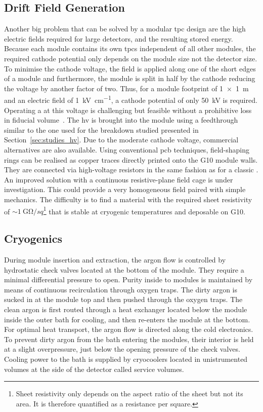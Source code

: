 \subsection{Drift Field Generation}
\label{sec:ac_argoncube_hv}

Another big problem that can be solved by a modular \gls{tpc} design are the high electric fields required for large detectors, and the resulting stored energy.
Because each module contains its own \glspl{tpc} independent of all other modules, the required cathode potential only depends on the module size not the detector size.
To minimise the cathode voltage, the field is applied along one of the short edges of a module and furthermore, the module is split in half by the cathode reducing the voltage by another factor of two.
Thus, for a module footprint of \SI{1 x 1}{\metre} and an electric field of \SI{1}{\kilo\volt\per\centi\metre}, a cathode potential of only \SI{50}{\kilo\volt} is required.
Operating a \lartpc{} at this voltage is challenging but feasible without a prohibitive loss in fiducial volume~\cite{AT}.
The \gls{hv} is brought into the module using a feedthrough similar to the one used for the breakdown studied presented in Section~\ref{sec:studies_hv}.
Due to the moderate cathode voltage, commercial alternatives are also available.
Using conventional \gls{pcb} techniques, field-shaping rings can be realised as copper traces directly printed onto the G10 module walls.
They are connected via high-voltage resistors in the same fashion as for a classic \lartpc{}.
An improved solution with a continuous resistive-plane field cage is under investigation.
This could provide a very homogeneous field paired with simple mechanics.
The difficulty is to find a material with the required sheet resistivity of $\sim{\SI{1}{\giga\ohm\per sq}}$\footnote{Sheet resistivity only depends on the aspect ratio of the sheet but not its area. It is therefore quantified as a resistance per square.} that is stable at cryogenic temperatures and deposable on G10.


\subsection{Cryogenics}
\label{sec:ac_argoncube_cryo}

During module insertion and extraction, the argon flow is controlled by hydrostatic check valves located at the bottom of the module.
They require a minimal differential pressure to open.
Purity inside to modules is maintained by means of continuous \lar{} recirculation through oxygen traps.
The dirty argon is sucked in at the module top and then pushed through the oxygen traps.
The clean argon is first routed through a heat exchanger located below the module inside the outer bath for cooling, and then re-enters the module at the bottom.
For optimal heat transport, the argon flow is directed along the cold electronics.
To prevent dirty argon from the bath entering the modules, their interior is held at a slight overpressure, just below the opening pressure of the check valves.
Cooling power to the bath is supplied by cryocoolers located in unistrumented volumes at the side of the detector called service volumes.

